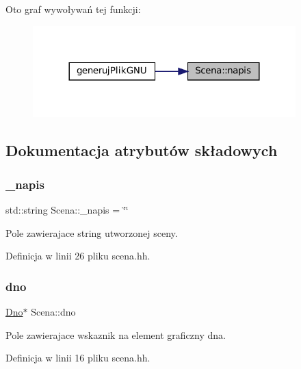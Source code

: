 Oto graf wywoływań tej funkcji\+:\nopagebreak
\begin{figure}[H]
\begin{center}
\leavevmode
\includegraphics[width=288pt]{class_scena_ab727dc0baa21dc3ef76f219f1d192e3f_icgraph}
\end{center}
\end{figure}


\subsection{Dokumentacja atrybutów składowych}
\mbox{\label{class_scena_a010d729b03bc1efaf244feb095e6ca80}} 
\subsubsection{\texorpdfstring{\_napis}{\_napis}}
{\footnotesize\ttfamily std\+::string Scena\+::\+\_\+napis = \char`\"{}\char`\"{}\hspace{0.3cm}{\ttfamily [private]}}

Pole zawierajace string utworzonej sceny. 

Definicja w linii 26 pliku scena.\+hh.

\mbox{\label{class_scena_a166396f31572e88d87aedad307de19be}} 
\subsubsection{\texorpdfstring{dno}{dno}}
{\footnotesize\ttfamily \mbox{\hyperlink{class_dno}{Dno}}$\ast$ Scena\+::dno\hspace{0.3cm}{\ttfamily [private]}}

Pole zawierajace wskaznik na element graficzny dna. 

Definicja w linii 16 pliku scena.\+hh.

\mbox{\label{class_scena_a031564e5e8422dc29e8dea5eff762f4d}} 
